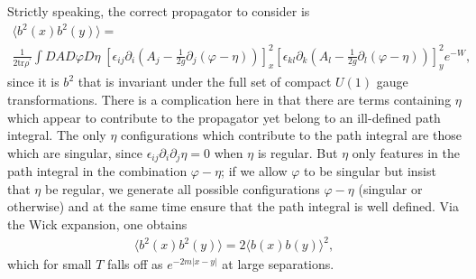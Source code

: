 \documentclass[a4paper,a4paper]{article}
\begin{document}
Strictly speaking, the correct propagator to consider is
\begin{multline}
\langle b^2(x) b^2(y) \rangle = \\
\frac {1}{2\mathrm{tr} \rho^{'}} \int DA D \varphi D \eta \;
\left[ \epsilon_{ij} \partial_i \left(A_j - \frac{1}{2g} \partial_j (\varphi - \eta)\right) \right]^{2}_{x}
\left[ \epsilon_{kl} \partial_k \left(A_l - \frac{1}{2g} \partial_l (\varphi - \eta)\right) \right]^{2}_{y}
e^{-W},
\end{multline}
since it is $b^2$ that is invariant under the full set of compact $U(1)$ gauge transformations.
There is a complication here in that there are terms containing $\eta$ which appear to contribute to the propagator
yet belong to an ill-defined path integral. The only $\eta$ configurations which contribute to the path integral
are those which are singular, since $\epsilon_{ij} \partial_i \partial_j \eta = 0$ when $\eta$ is regular.
But $\eta$ only features in the path integral in the combination $\varphi - \eta$; if we allow $\varphi$
to be singular but insist that $\eta$ be regular, we generate all possible configurations
$\varphi - \eta$ (singular or otherwise)
and at the same time ensure that the path integral is well defined. Via the Wick expansion, one obtains
\begin{gather}
\langle b^2(x) b^2(y) \rangle = 2 \langle b(x) b(y) \rangle^2,
\end{gather}
which for small $T$ falls off as $e^{-2m|x-y| }$ at large separations.
\end{document}
